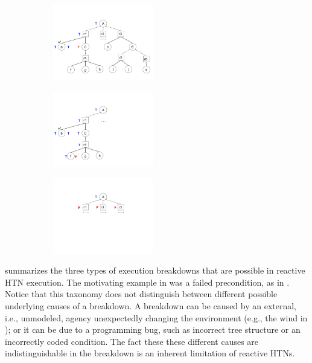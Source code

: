 \documentclass{llncs}
\begin{document}
\begin{figure}[t]
\centering
\begin{subfigure}{2.1in}
\centerline{\includegraphics[height=1.3in]{figs/precondition}}
\vskip 8pt 
\end{subfigure}
\hfill
\begin{subfigure}{1.4in}
\centerline{\includegraphics[height=1.3in]{figs/postcondition}}
\vskip 8pt 
\end{subfigure}
\hfill
\begin{subfigure}{1in}
\centerline{\includegraphics[height=1.3in]{figs/applicability}}
\vskip -2pt
\end{subfigure}
\vskip 4pt 
\end{figure}

 summarizes the three types of execution breakdowns
that are possible in reactive HTN execution.  The motivating example
in  was a failed precondition, as in
.  Notice that this taxonomy does not distinguish
between different possible underlying causes of a breakdown.  A
breakdown can be caused by an external, i.e., unmodeled, agency
unexpectedly changing the environment (e.g., the wind in
); or it can be due to a programming bug, such as
incorrect tree structure or an incorrectly coded condition.  The fact
these these different causes are indistinguishable in the breakdown is
an inherent limitation of reactive HTNs.
\end{document}
